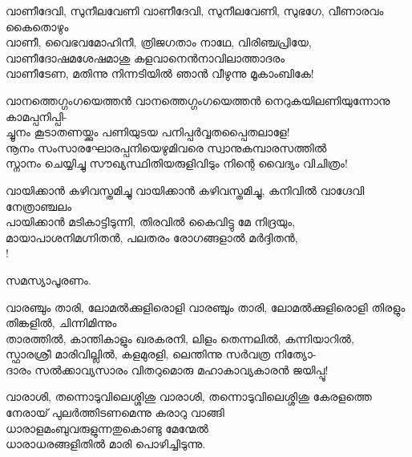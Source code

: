\begin{enumerate}

\begin{slokam}{\VSv}{\Unk}{വാണീദേവി, സുനീലവേണി}
 വാണീദേവി, സുനീലവേണി, സുഭഗേ, വീണാരവം കൈതൊഴും\\
വാണീ, വൈഭവമോഹിനീ, ത്രിജഗതാം നാഥേ, വിരിഞ്ചപ്രിയേ,\\
വാണീദോഷമശേഷമാശു കളവാനെൻനാവിലാത്താദരം\\
വാണീടേണ, മതിന്നു നിന്നടിയിൽ ഞാൻ വീഴുന്നു മൂകാംബികേ!
\end{slokam}


\begin{slokam}{\VSr}{\VNM}{വാനത്തെഗ്ഗംഗയെത്തൻ }
വാനത്തെഗ്ഗംഗയെത്തൻ നെറുകയിലണിയുന്നോനു കാമപ്പനിപ്പി-\\
ച്ചൂനം കൂടാതണയ്ക്കും പണിയുടയ പനിപ്പർവ്വതപ്പൈതലാളേ!\\
നൂനം സംസാരഘോരപ്പനിയെഴുമിവരെ സ്വാനുകമ്പാരസത്തിൽ\\
സ്നാനം ചെയ്യിച്ചു സൗഖ്യസ്ഥിതിയരുളിവിടും നിന്റെ വൈദ്യം വിചിത്രം!
\end{slokam}


\begin{slokam}{\VSv}{\Nalankal}{വായിക്കാൻ കഴിവസ്തമിച്ചു}
വായിക്കാൻ കഴിവസ്തമിച്ചു, കനിവിൽ വാഗ്ദേവി നേത്രാഞ്ചലം\\
പായിക്കാൻ മടികാട്ടിടുന്നി, തിരവിൽ കൈവിട്ടു മേ നിദ്രയും,\\
മായാപാശനിമഗ്നിതൻ, പലതരം രോഗങ്ങളാൽ മർദ്ദിതൻ,\\
!
\end{slokam}



സമസ്യാപൂരണം. 


\begin{slokam}{\VSr}{\KND}{വാരഞ്ചും താരി, ലോമൽക്കുളിരൊളി}
 വാരഞ്ചും താരി, ലോമൽക്കുളിരൊളി തിരളും തിങ്കളിൽ, ചിന്നിമിന്നും\\
താരത്തിൽ, കാന്തികാളും ഖരകരനി, ലിളം തെന്നലിൽ, കന്നിയാറിൽ,\\
സ്ഫാരശ്രീ മാരിവില്ലിൽ, കളമുരളി, ലെന്തിന്നു സർവത്ര നിത്യോ-\\
ദാരം സൽക്കാവ്യസാരം വിതറുമൊരു മഹാകാവ്യകാരൻ ജയിപ്പൂ!
\end{slokam}




\begin{slokam}{\VVt}{\Ull}{വാരാശി, തന്നൊടുവിലെശ്ശിശു}
 വാരാശി, തന്നൊടുവിലെശ്ശിശു കേരളത്തെ\\
നേരായ്‌ പുലർത്തിടണമെന്നു കരാറു വാങ്ങി\\
ധാരാളമംബുവരുളുന്നതുകൊണ്ടു മേന്മേൽ\\
ധാരാധരങ്ങളിതിൽ മാരി പൊഴിച്ചിടുന്നു.
\end{slokam}


\end{enumerate}
